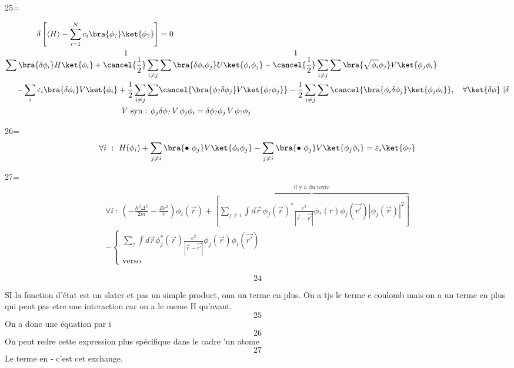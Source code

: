 25=

\begin{equation}
\begin{split}
\delta \left[\left\langle H\right\rangle - \sum_{i=1}^{N} c_i \bra{\phi_?}\ket{\phi_?}\right] &= 0\\
\sum \bra{\delta\phi_i}H\ket{\phi_i} + \overset{\displaystyle\ 1}{\cancel{\frac{1}{2}}} \sum_{i\neq j} &\sum \bra{\delta\phi_i\phi_j}U\ket{\phi_i\phi_j} - \overset{\displaystyle\ 1}{\cancel{\frac{1}{2}}} \sum_{i\neq j}\sum \bra{\sqrt{\phi_i}\phi_j}V\ket{\phi_j\phi_i}\\
-\sum_i \varepsilon_i\bra{\delta \phi_i}V\ket{\phi_i} +\frac{1}{2}\sum_{i\neq j}\sum &\cancel{\bra{\phi_?\delta\phi_j}V\ket{\phi_?\phi_j}} - \frac{1}{2}\sum_{i \neq j} \sum \cancel{\bra{\phi_i\delta\phi_j}\ket{\phi_j\phi_i}},\quad \forall \ket{\delta\phi}\ |\delta\\
V \text{ syn : } \phi_j &\delta\phi_?\,V\,\phi_j\phi_i = \delta\phi_?\phi_j\,V\,\phi_?\phi_j
\end{split}
\end{equation}

26=
\begin{equation}
\forall i\ :\ H(\phi_i) + \sum_{j\neq i}\bra{\bullet\ \phi_j}V\ket{\phi_i\phi_j}- \sum_{j\neq i} \bra{\bullet\ \phi_j}V\ket{\phi_j\phi_i} = \varepsilon_i\ket{\phi_?}
\end{equation}

27=
\begin{equation}
\begin{split}
\forall i\ :\ \left(-\frac{\hbar^2\Delta^2}{2m}-\frac{Z e^2}{r}\right)\phi_i(\vec r) + \overbrace{\left[\sum_{j\neq i}\int d\vec r\,\phi_j(\vec r)^*\frac{e^2}{|\vec r - \vec{r'}|}\phi_?(r)\phi_j(\vec {r'}) |\phi_j(\vec r)|^2\right]}^{\text{il y a du texte}} \\- \begin{cases}
\sum_{?} \int d\vec r \phi_j^*(\vec r)\frac{e^2}{|\vec r - \vec{r'}|} \phi_j(\vec r)\phi_i(\vec{r'})\\
\text{verso}
\end{cases}
\end{split}
\end{equation}


\begin{equation}
24
\end{equation}


SI la fonction d'état est un slater et pas un simple product, ona un terme en plus. On a tjs le terme e coulomb mais on a 
un terme en plus qui peut pas etre une interaction car on a le meme H qu'avant.
\begin{equation}
25
\end{equation}
On a donc une équation par i
\begin{equation}
26
\end{equation}
On peut redre cette expression plus spécifique dans le cadre 'un atome
\begin{equation}
27
\end{equation}
Le terme en - c'est cet exchange.\\

